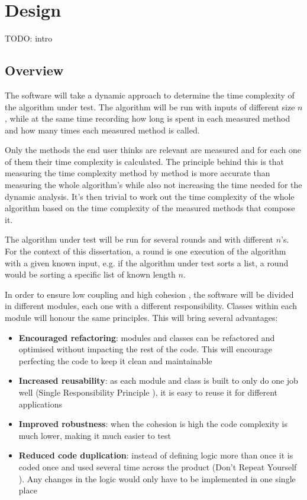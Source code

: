 \chapter{Design}

TODO: intro

\section{Overview}
The software will take a dynamic approach to determine the time complexity of the algorithm under test. The algorithm will be run with inputs of different size $n$, while at the same time recording how long is spent in each measured method and how many times each measured method is called.

\noindent Only the methods the end user thinks are relevant are measured and for each one of them their time complexity is calculated. The principle behind this is that measuring the time complexity method by method is more accurate than measuring the whole algorithm's while also not increasing the time needed for the dynamic analysis. It's then trivial to work out the time complexity of the whole algorithm based on the time complexity of the measured methods that compose it.


\noindent The algorithm under test will be run for several rounds and with different $n$'s. For the context of this dissertation, a round is one execution of the algorithm with a given known input, e.g. if the algorithm under test sorts a list, a round would be sorting a specific list of known length $n$.

\noindent In order to ensure low coupling and high cohesion \cite{EYC79}, the software will be divided in different modules, each one with a different responsibility. Classes within each module will honour the same principles. This will bring several advantages:
\begin{itemize}
  \item \textbf{Encouraged refactoring}: modules and classes can be refactored and optimised without impacting the rest of the code. This will encourage perfecting the code to keep it clean and maintainable
  \item \textbf{Increased reusability}: as each module and class is built to only do one job well (Single Responsibility Principle \cite{RCM03}), it is easy to reuse it for different applications
  \item \textbf{Improved robustness}: when the cohesion is high the code complexity is much lower, making it much easier to test
  \item \textbf{Reduced code duplication}: instead of defining logic more than once it is coded once and used several time across the product (Don't Repeat Yourself \cite{AHT99}). Any changes in the logic would only have to be implemented in one single place
\end{itemize}

